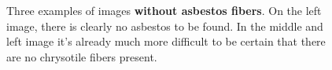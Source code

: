 \begin{figure}[h]
\centering
\caption{Three examples of images \textbf{without asbestos fibers}. On the left image, there is clearly no asbestos to be found. In the middle and left image it's already much more difficult to be certain that there are no chrysotile fibers present.}
\label{fig:non-asbestos_examples}
\end{figure}

